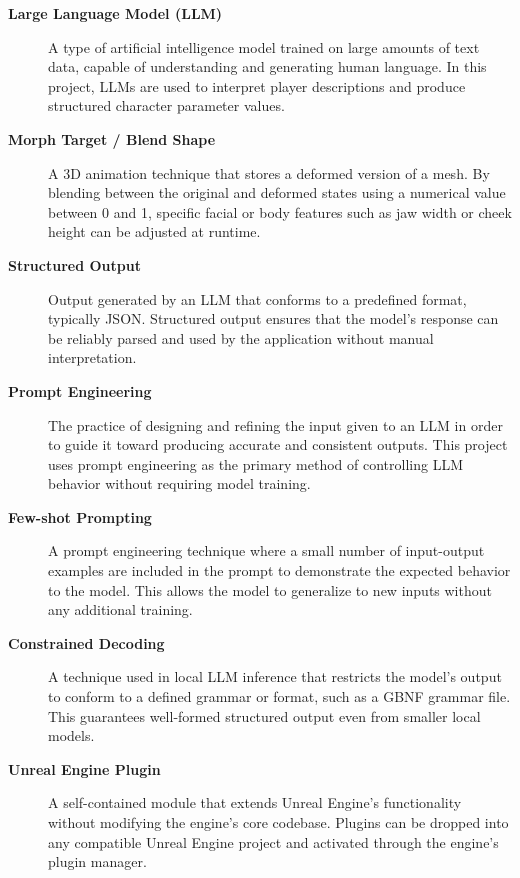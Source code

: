 \begin{description}
    \item[\textbf{Large Language Model (LLM)}] A type of artificial 
    intelligence model trained on large amounts of text data, capable 
    of understanding and generating human language. In this project, 
    LLMs are used to interpret player descriptions and produce 
    structured character parameter values.

    \item[\textbf{Morph Target / Blend Shape}] A 3D animation 
    technique that stores a deformed version of a mesh. By blending 
    between the original and deformed states using a numerical value 
    between 0 and 1, specific facial or body features such as jaw 
    width or cheek height can be adjusted at runtime.

    \item[\textbf{Structured Output}] Output generated by an LLM 
    that conforms to a predefined format, typically JSON. Structured 
    output ensures that the model's response can be reliably parsed 
    and used by the application without manual interpretation.

    \item[\textbf{Prompt Engineering}] The practice of designing and 
    refining the input given to an LLM in order to guide it toward 
    producing accurate and consistent outputs. This project uses 
    prompt engineering as the primary method of controlling LLM 
    behavior without requiring model training.

    \item[\textbf{Few-shot Prompting}] A prompt engineering technique 
    where a small number of input-output examples are included in the 
    prompt to demonstrate the expected behavior to the model. This 
    allows the model to generalize to new inputs without any 
    additional training.

    \item[\textbf{Constrained Decoding}] A technique used in local 
    LLM inference that restricts the model's output to conform to a 
    defined grammar or format, such as a GBNF grammar file. This 
    guarantees well-formed structured output even from smaller local 
    models.

    \item[\textbf{Unreal Engine Plugin}] A self-contained module that 
    extends Unreal Engine's functionality without modifying the 
    engine's core codebase. Plugins can be dropped into any 
    compatible Unreal Engine project and activated through the 
    engine's plugin manager.


\end{description}
